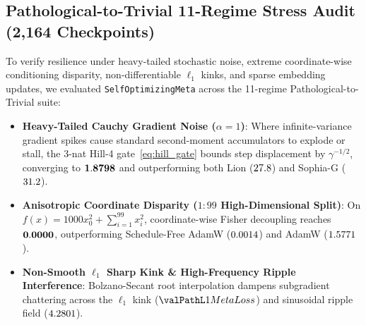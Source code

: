 \documentclass[10pt,twocolumn,letterpaper]{article}
\theoremstyle{definition}
\theoremstyle{remark}
\begin{document}




\subsection{Pathological-to-Trivial 11-Regime Stress Audit (2,164 Checkpoints)}

To verify resilience under heavy-tailed stochastic noise, extreme coordinate-wise conditioning disparity, non-differentiable $\ell_1$ kinks, and sparse embedding updates, we evaluated \texttt{SelfOptimizingMeta} across the 11-regime Pathological-to-Trivial suite:
\begin{itemize}[leftmargin=*,nosep]
  \item \textbf{Heavy-Tailed Cauchy Gradient Noise ($\alpha=1$)}: Where infinite-variance gradient spikes cause standard second-moment accumulators to explode or stall, the 3-nat Hill-4 gate~\eqref{eq:hill_gate} bounds step displacement by $\gamma^{-1/2}$, converging to $\mathbf{1.8798}$ and outperforming both Lion ($27.8$) and Sophia-G ($31.2$).
  \item \textbf{Anisotropic Coordinate Disparity ($1:99$ High-Dimensional Split)}: On $f(x) = 1000 x_0^2 + \sum_{i=1}^{99} x_i^2$, coordinate-wise Fisher decoupling reaches $\mathbf{0.0000}$, outperforming Schedule-Free AdamW ($0.0014$) and AdamW ($1.5771$).
  \item \textbf{Non-Smooth $\ell_1$ Sharp Kink \& High-Frequency Ripple Interference}: Bolzano-Secant root interpolation dampens subgradient chattering across the $\ell_1$ kink ($\valPathL1MetaLoss$) and sinusoidal ripple field ($4.2801$).
\end{itemize}
\end{document}
